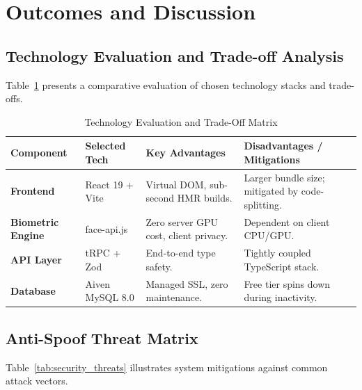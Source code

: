 \documentclass[12pt,a4paper,oneside]{article}
\begin{document}
\section{Outcomes and Discussion}
\label{sec:outcomes}

\subsection{Technology Evaluation and Trade-off Analysis}
Table~\ref{tab:tech_matrix} presents a comparative evaluation of chosen technology stacks and trade-offs.

\begin{table}[h!]
\centering
\renewcommand{\arraystretch}{1.3}
\caption{Technology Evaluation and Trade-Off Matrix}
\label{tab:tech_matrix}
\small
\begin{tabular}{|p{2.5cm}|p{3.0cm}|p{4.5cm}|p{4.8cm}|}
\hline
\rowcolor{gray!15} \textbf{Component} & \textbf{Selected Tech} & \textbf{Key Advantages} & \textbf{Disadvantages / Mitigations} \\ \hline
\textbf{Frontend} & React 19 + Vite & Virtual DOM, sub-second HMR builds. & Larger bundle size; mitigated by code-splitting. \\ \hline
\textbf{Biometric Engine} & face-api.js & Zero server GPU cost, client privacy. & Dependent on client CPU/GPU. \\ \hline
\textbf{API Layer} & tRPC + Zod & End-to-end type safety. & Tightly coupled TypeScript stack. \\ \hline
\textbf{Database} & Aiven MySQL 8.0 & Managed SSL, zero maintenance. & Free tier spins down during inactivity. \\ \hline
\end{tabular}
\end{table}

\subsection{Anti-Spoof Threat Matrix}
Table~\ref{tab:security_threats} illustrates system mitigations against common attack vectors.
\end{document}

